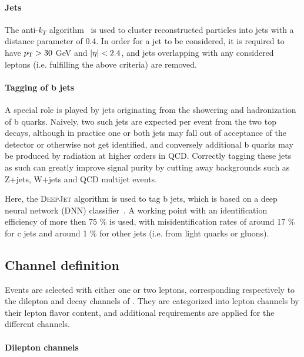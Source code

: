 \paragraph{Jets}

The anti-$k_T$ algorithm~\cite{Cacciari:2008gp} is used to cluster reconstructed particles into jets with a distance parameter of 0.4. In order for a jet to be considered, it is required to have $p_{\mathrm{T}} > 30$ GeV and $|\eta| < 2.4$, and jets overlapping with any considered leptons (i.e. fulfilling the above criteria) are removed. %

\paragraph{Tagging of b jets}

A special role is played by jets originating from the showering and hadronization of b quarks. Naively, two such jets are expected per \ttbar event from the two top decays, although in practice one or both jets may fall out of acceptance of the detector or otherwise not get identified, and conversely additional b quarks may be produced by radiation at higher orders in QCD. Correctly tagging these jets as such can greatly improve signal purity by cutting away backgrounds such as Z+jets, W+jets and QCD multijet events.

Here, the \textsc{DeepJet} algorithm is used to tag b jets, which is based on a deep neural network (DNN) classifier~\cite{DeepJet:2020,CMS:BTV-16-002}. A working point with an identification efficiency of more then 75 \% is used, with misidentification rates of around 17 \% for c jets and around 1 \% for other jets (i.e. from light quarks or gluons).

\subsection{Channel definition}
\label{sec:ttxs:channels}

Events are selected with either one or two leptons, corresponding respectively to the dilepton and \ljets decay channels of \ttbar. They are categorized into lepton channels by their lepton flavor content, and additional requirements are applied for the different channels. 

\paragraph{Dilepton channels}

